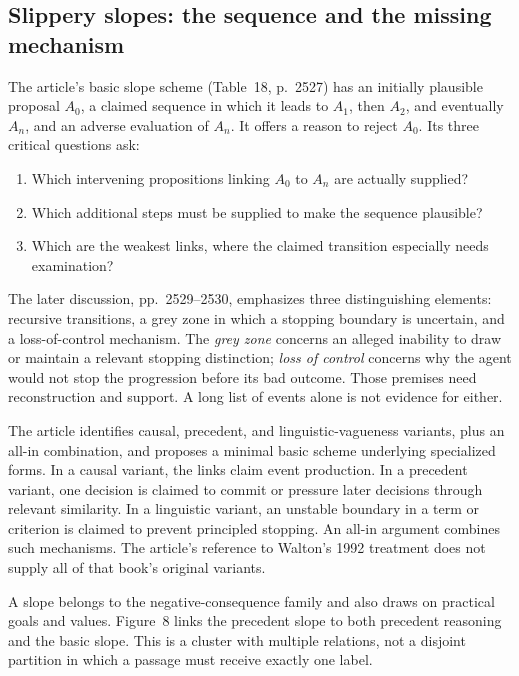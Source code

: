 \subsection{Slippery slopes: the sequence and the missing mechanism}

The article's basic slope scheme (Table~18, p.~2527) has an initially
plausible proposal \(A_0\), a claimed sequence in which it leads to
\(A_1\), then \(A_2\), and eventually \(A_n\), and an adverse evaluation
of \(A_n\). It offers a reason to reject \(A_0\).
Its three critical questions ask:

\begin{enumerate}
\item Which intervening propositions linking \(A_0\) to \(A_n\)
are actually supplied?
\item Which additional steps must be supplied to make the sequence
plausible?
\item Which are the weakest links, where the claimed transition
especially needs examination?
\end{enumerate}

The later discussion, pp.~2529--2530, emphasizes three distinguishing
elements: recursive transitions, a grey zone in which a stopping
boundary is uncertain, and a loss-of-control mechanism.
The \emph{grey zone} concerns an alleged inability to draw or maintain
a relevant stopping distinction; \emph{loss of control} concerns
why the agent would not stop the progression before its bad outcome.
Those premises need reconstruction and support. A long list of events
alone is not evidence for either.

The article identifies causal, precedent, and linguistic-vagueness
variants, plus an all-in combination, and proposes a minimal basic
scheme underlying specialized forms. In a causal variant, the links
claim event production. In a precedent variant, one decision is
claimed to commit or pressure later decisions through relevant similarity.
In a linguistic variant, an unstable boundary in a term or criterion
is claimed to prevent principled stopping. An all-in argument combines
such mechanisms. The article's reference to Walton's 1992 treatment
does not supply all of that book's original variants.

A slope belongs to the negative-consequence family and also draws
on practical goals and values. Figure~8 links the precedent slope
to both precedent reasoning and the basic slope.
This is a cluster with multiple relations, not a disjoint partition
in which a passage must receive exactly one label.

